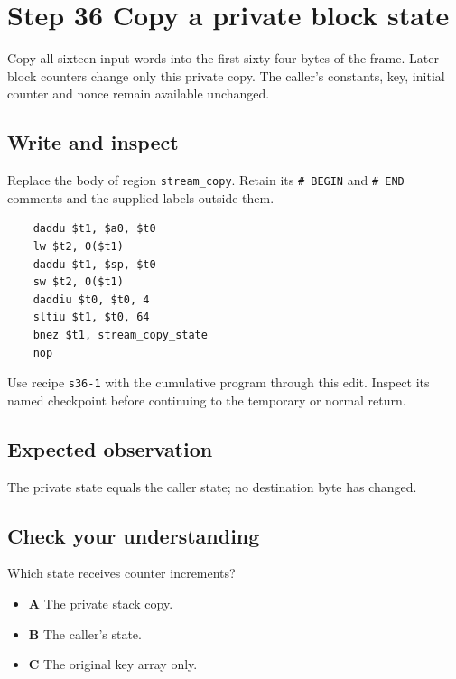 \section{Step 36 Copy a private block state}\label{chacha-s36}

Copy all sixteen input words into the first sixty-four bytes of the frame. Later block counters change only this private copy. The caller's constants, key, initial counter and nonce remain available unchanged.

\subsection{Write and inspect}
Replace the body of region \texttt{stream\_copy}. Retain its \texttt{\# BEGIN} and \texttt{\# END} comments and the supplied labels outside them.

\begin{verbatim}
    daddu $t1, $a0, $t0
    lw $t2, 0($t1)
    daddu $t1, $sp, $t0
    sw $t2, 0($t1)
    daddiu $t0, $t0, 4
    sltiu $t1, $t0, 64
    bnez $t1, stream_copy_state
    nop
\end{verbatim}

Use recipe \texttt{s36-1} with the cumulative program through this edit. Inspect its named checkpoint before continuing to the temporary or normal return.

\subsection{Expected observation}
The private state equals the caller state; no destination byte has changed.

\subsection{Check your understanding}
Which state receives counter increments?

\begin{itemize}
\item \textbf{A} The private stack copy.
\item \textbf{B} The caller's state.
\item \textbf{C} The original key array only.
\end{itemize}
